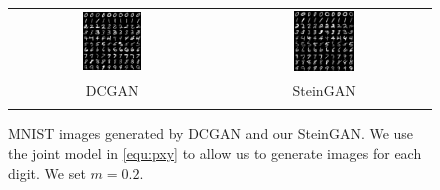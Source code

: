 \begin{figure}[htb]
\centering
\begin{tabular}{cc}
\includegraphics[width=0.3\textwidth]{figures/mnist/dcgan_mnist.pdf} & 
\includegraphics[width=0.3\textwidth]{figures/mnist/mnist_steingan.pdf}   \\
DCGAN & SteinGAN \\
\vspace{5\baselineskip}
\end{tabular}

\caption{
 MNIST images generated by DCGAN and our SteinGAN. We use the joint model in \eqref{equ:pxy} to allow us to generate images for each digit. We set $m = 0.2$. 
}
\label{fig:mnist}
\end{figure}



